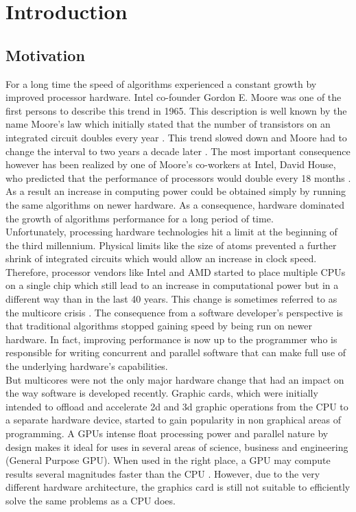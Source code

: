 \section{Introduction}

\subsection{Motivation}

For a long time the speed of algorithms experienced a constant growth by improved processor hardware. Intel co-founder Gordon E. Moore was one of the first persons to describe this trend in 1965. This description is well known by the name Moore's law which initially stated that the number of transistors on an integrated circuit doubles every year \cite{moore_law}. This trend slowed down and Moore had to change the interval to two years a decade later \cite{moore_law_2003}. The most important consequence however has been realized by one of Moore's co-workers at Intel, David House, who predicted that the performance of processors would double every 18 months \cite{moore_law_2003}. As a result an increase in computing power could be obtained simply by running the same algorithms on newer hardware. As a consequence, hardware dominated the growth of algorithms performance for a long period of time.
\\
Unfortunately, processing hardware technologies hit a limit at the beginning of the third millennium. Physical limits like the size of atoms prevented a further shrink of integrated circuits which would allow an increase in clock speed. Therefore, processor vendors like Intel and AMD started to place multiple CPUs on a single chip which still lead to an increase in computational power but in a different way than in the last 40 years. This change is sometimes referred to as the multicore crisis \cite{multicore_crisis}. The consequence from a software developer's perspective is that traditional algorithms stopped gaining speed by being run on newer hardware. In fact, improving performance is now up to the programmer who is responsible for writing concurrent and parallel software that can make full use of the underlying hardware's capabilities. 
\\
But multicores were not the only major hardware change that had an impact on the way software is developed recently. Graphic cards, which were initially intended to offload and accelerate 2d and 3d graphic operations from the CPU to a separate hardware device, started to gain popularity in non graphical areas of programming. A GPUs intense float processing power and parallel nature by design makes it ideal for uses in several areas of science, business and engineering (General Purpose GPU). When used in the right place, a GPU may compute results several magnitudes faster than the CPU \cite{gpu_history}. However, due to the very different hardware architecture, the graphics card is still not suitable to efficiently solve the same problems as a CPU does.
